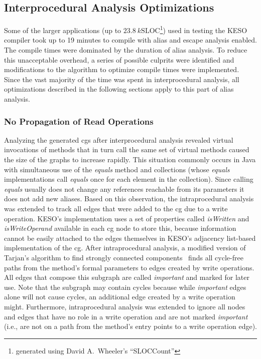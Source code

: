 		\subsection{Interprocedural Analysis Optimizations}
			\label{subsec:ea:improve:opt}
			Some of the larger applications (up to $23.8~k\mathrm{SLOC}$\footnote{generated using David A.\ Wheeler's
			\enquote{SLOCCount}}) used in testing the KESO compiler took up to 19 minutes to compile with alias and escape
			analysis enabled. The compile times were dominated by the duration of alias analysis. To reduce this unacceptable
			overhead, a series of possible culprits were identified and modifications to the algorithm to optimize compile
			times were implemented. Since the vast majority of the time was spent in interprocedural analysis, all
			optimizations described in the following sections apply to this part of alias analysis.

			\subsubsection{No Propagation of Read Operations}
				\label{subsub:ea:improve:opt:writeonly}
				Analyzing the generated \glspl{cg} after interprocedural analysis revealed virtual invocations of methods that
				in turn call the same set of virtual methods caused the size of the graphs to increase rapidly. This situation
				commonly occurs in Java with simultaneous use of the \emph{equals} method and collections (whose \emph{equals}
				implementations call \emph{equals} once for each element in the collection). Since calling \emph{equals} usually
				does not change any references reachable from its parameters it does not add new aliases. Based on this
				observation, the intraprocedural analysis was extended to track all edges that were added to the \gls{cg} due to
				a write operation. KESO's implementation uses a set of properties called \emph{isWritten} and
				\emph{isWriteOperand} available in each \acrlong{cg} node to store this, because information cannot be easily
				attached to the edges themselves in KESO's adjacency list-based implementation of the \gls{cg}. After
				intraprocedural analysis, a modified version of Tarjan's algorithm to find strongly connected
				components~\cite{tarjan:72:lga} finds all cycle-free paths from the method's formal parameters to edges created
				by write operations. All edges that compose this subgraph are called \emph{important} and marked for later use.
				Note that the subgraph may contain cycles because while \emph{important} edges alone will not cause cycles, an
				additional edge created by a write operation might. Furthermore, intraprocedural analysis was extended to ignore
				all nodes and edges that have no role in a write operation and are not marked \emph{important} (i.e., are not on
				a path from the method's entry points to a write operation edge).


